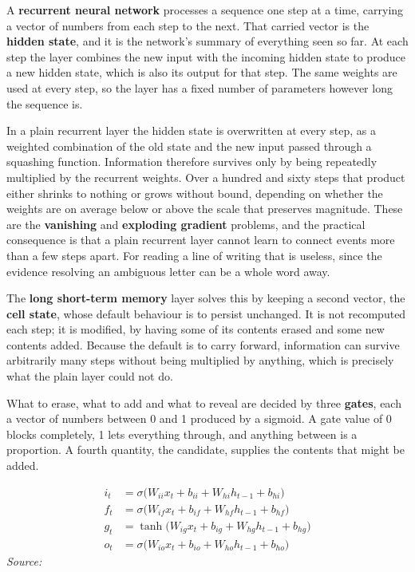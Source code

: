 A \textbf{recurrent neural network} processes a sequence one step at a time, carrying a vector of numbers from each step to the next. That carried vector is the \textbf{hidden state}, and it is the network's summary of everything seen so far. At each step the layer combines the new input with the incoming hidden state to produce a new hidden state, which is also its output for that step. The same weights are used at every step, so the layer has a fixed number of parameters however long the sequence is.


In a plain recurrent layer the hidden state is overwritten at every step, as a weighted combination of the old state and the new input passed through a squashing function. Information therefore survives only by being repeatedly multiplied by the recurrent weights. Over a hundred and sixty steps that product either shrinks to nothing or grows without bound, depending on whether the weights are on average below or above the scale that preserves magnitude. These are the \textbf{vanishing} and \textbf{exploding gradient} problems, and the practical consequence is that a plain recurrent layer cannot learn to connect events more than a few steps apart. For reading a line of writing that is useless, since the evidence resolving an ambiguous letter can be a whole word away.


The \textbf{long short-term memory} layer \cite{hochreiter1997} solves this by keeping a second vector, the \textbf{cell state}, whose default behaviour is to persist unchanged. It is not recomputed each step; it is modified, by having some of its contents erased and some new contents added. Because the default is to carry forward, information can survive arbitrarily many steps without being multiplied by anything, which is precisely what the plain layer could not do.

What to erase, what to add and what to reveal are decided by three \textbf{gates}, each a vector of numbers between 0 and 1 produced by a sigmoid. A gate value of 0 blocks completely, 1 lets everything through, and anything between is a proportion. A fourth quantity, the candidate, supplies the contents that might be added.


\begin{equation}
\begin{aligned}i_t &= \sigma\big(W_{ii} x_t + b_{ii} + W_{hi} h_{t-1} + b_{hi}\big) \\[2pt]f_t &= \sigma\big(W_{if} x_t + b_{if} + W_{hf} h_{t-1} + b_{hf}\big) \\[2pt]g_t &= \tanh\big(W_{ig} x_t + b_{ig} + W_{hg} h_{t-1} + b_{hg}\big) \\[2pt]o_t &= \sigma\big(W_{io} x_t + b_{io} + W_{ho} h_{t-1} + b_{ho}\big)\end{aligned}
\end{equation}
\noindent\emph{Source: }\cite{hochreiter1997}


